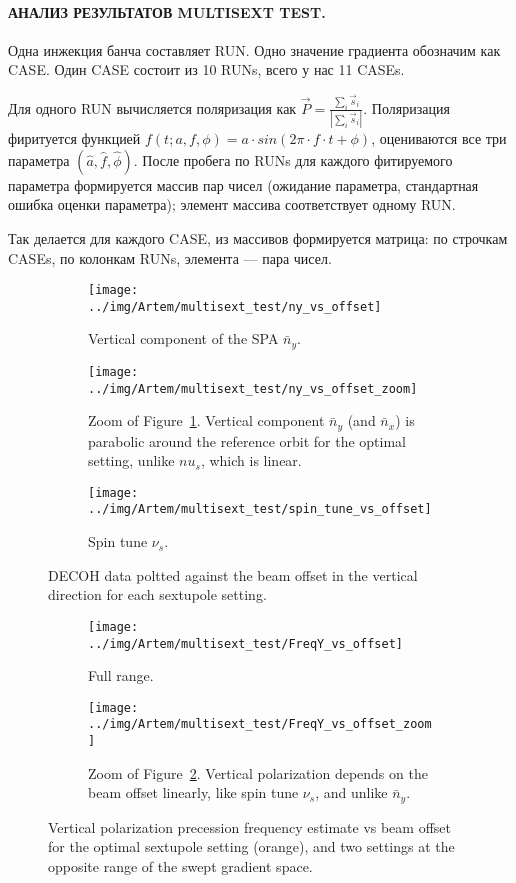 \documentclass{report}
\begin{document}
\paragraph{АНАЛИЗ РЕЗУЛЬТАТОВ MULTISEXT TEST.}
Одна инжекция банча составляет RUN. Одно значение градиента обозначим как CASE. Один CASE состоит из 10 RUNs, всего у нас 11 CASEs.

Для одного RUN вычисляется поляризация как $\vec P = \frac{\sum_i\vec s_i}{|\sum_i\vec s_i|}$. Поляризация фиритуется функцией $f(t; a,f,\phi) = a\cdot sin(2\pi\cdot f\cdot t + \phi)$, оцениваются все три параметра $(\hat a, \hat f, \hat\phi)$. После пробега по RUNs для каждого фитируемого параметра формируется массив пар чисел (ожидание параметра, стандартная ошибка оценки параметра); элемент массива соответствует одному RUN.

Так делается для каждого CASE, из массивов формируется матрица: по строчкам CASEs, по колонкам RUNs, элемента --- пара чисел.

\begin{figure}[H]
  \centering
  \begin{subfigure}[b]{\textwidth}
    \texttt{[image: ../img/Artem/multisext\_test/ny\_vs\_offset]}
    \caption{Vertical component of the SPA $\bar n_y$.\label{fig:DECOH_full_ny}}
  \end{subfigure}

  \begin{subfigure}[b]{\textwidth}
    \texttt{[image: ../img/Artem/multisext\_test/ny\_vs\_offset\_zoom]}
    \caption{Zoom of Figure~\ref{fig:DECOH_full_ny}. Vertical component $\bar n_y$ (and $\bar n_x$) is parabolic around the reference orbit for the optimal setting, unlike $nu_s$, which is linear.}
  \end{subfigure}
  
  \begin{subfigure}[b]{\textwidth}
    \texttt{[image: ../img/Artem/multisext\_test/spin\_tune\_vs\_offset]}
    \caption{Spin tune $\nu_s$.}
  \end{subfigure}
  \caption{DECOH data poltted against the beam offset in the vertical direction for each sextupole setting.}
\end{figure}

\begin{figure}[H]
  \centering
  \begin{subfigure}[b]{\textwidth}
    \texttt{[image: ../img/Artem/multisext\_test/FreqY\_vs\_offset]}
    \caption{Full range.\label{fig:FreqY_vs_offset}}
  \end{subfigure}

  \begin{subfigure}[b]{\textwidth}
    \texttt{[image: ../img/Artem/multisext\_test/FreqY\_vs\_offset\_zoom]}
    \caption{Zoom of Figure~\ref{fig:FreqY_vs_offset}. Vertical polarization depends on the beam offset linearly, like spin tune $\nu_s$, and unlike $\bar n_y$.}
  \end{subfigure}
  \caption{Vertical polarization precession frequency estimate vs beam offset for the optimal sextupole setting (orange), and two settings at the opposite range of the swept gradient space.}
\end{figure}
\end{document}
